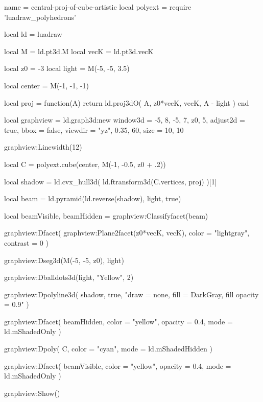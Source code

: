 \documentclass[border = 3pt]{standalone}
\begin{document}
\begin{luadraw*}{name = central-proj-of-cube-artistic}
local polyext = require 'luadraw_polyhedrons'

local ld = luadraw

local M    = ld.pt3d.M
local vecK = ld.pt3d.vecK

local z0    = -3
local light = M(-5, -5, 3.5)

local center = M(-1, -1, -1)

local proj = function(A)
  return ld.proj3dO(
    A,
    {z0*vecK, vecK},
    A - light
  )
end

local graphview = ld.graph3d:new{
  window3d = {-5, 8, -5, 7, z0, 5},
  adjust2d = true,
  bbox     = false,
  viewdir  = {"yz", 0.35, 60},
  size     = {10, 10}
}

graphview:Linewidth(12)

local C = polyext.cube(center, M(-1, -0.5, z0 + .2))

local shadow = ld.cvx_hull3d(
  ld.ftransform3d(C.vertices, proj)
)[1]

local beam = ld.pyramid(ld.reverse(shadow), light, true)

local beamVisible, beamHidden = graphview:Classifyfacet(beam)

graphview:Dfacet(
  graphview:Plane2facet({z0*vecK, vecK}),
  {
    color    = "lightgray",
    contrast = 0
  }
)

graphview:Dseg3d({M(-5, -5, z0), light})

graphview:Dballdots3d(light, "Yellow", 2)

graphview:Dpolyline3d(
  shadow,
  true,
  "draw = none, fill = DarkGray, fill opacity = 0.9"
)

graphview:Dfacet(
  beamHidden,
  {
    color   = "yellow",
    opacity = 0.4,
    mode    = ld.mShadedOnly
  }
)

graphview:Dpoly(
  C,
  {
    color = "cyan",
    mode  = ld.mShadedHidden
  }
)

graphview:Dfacet(
  beamVisible,
  {
    color   = "yellow",
    opacity = 0.4,
    mode    = ld.mShadedOnly
  }
)

graphview:Show()
\end{luadraw*}
\end{document}
